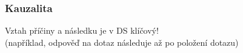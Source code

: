 \documentclass[usenames,dvipsnames,9pt]{beamer}
\begin{document}
\begin{frame}
  \frametitle{Kauzalita}

  \begin{center}
  	{\LARGE Vztah příčiny a následku je v DS klíčový!} \\
  	(například, odpověď na dotaz následuje až po položení dotazu)

  	\vspace{1.5em}


\end{center}
\end{frame}
\end{document}
